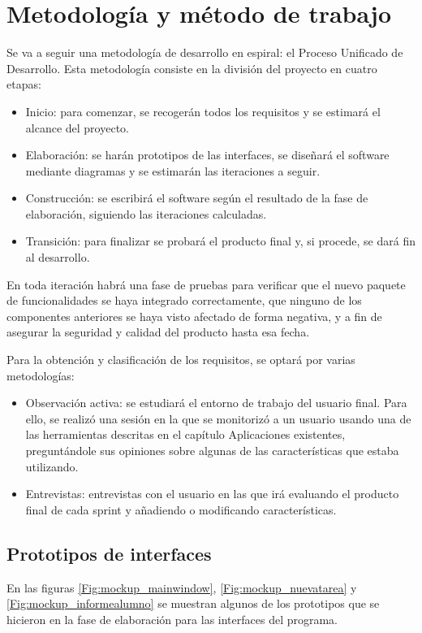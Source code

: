 \chapter{Metodología y método de trabajo}
\label{cap:MiMetodologia}


Se va a seguir una metodología de desarrollo en espiral: el Proceso Unificado de Desarrollo. Esta metodología consiste en la división del proyecto en cuatro etapas:
\begin{itemize}
    \item Inicio: para comenzar, se recogerán todos los requisitos y se estimará el alcance del proyecto.
    \item Elaboración: se harán prototipos de las interfaces, se diseñará el software mediante diagramas y se estimarán las iteraciones a seguir.
    \item Construcción: se escribirá el software según el resultado de la fase de elaboración, siguiendo las iteraciones calculadas. 
    \item Transición: para finalizar se probará el producto final y, si procede, se dará fin al desarrollo.
\end{itemize}
En toda iteración habrá una fase de pruebas para verificar que el nuevo paquete de funcionalidades se haya integrado correctamente, que ninguno de los componentes anteriores se haya visto afectado de forma negativa, y a fin de asegurar la seguridad y calidad del producto hasta esa fecha.

Para la obtención y clasificación de los requisitos, se optará por varias metodologías:
\begin{itemize}
	\item Observación activa: se estudiará el entorno de trabajo del usuario final. Para ello, se realizó una sesión en la que se monitorizó a un usuario usando una de las herramientas descritas en el capítulo Aplicaciones existentes, preguntándole sus opiniones sobre algunas de las características que estaba utilizando.
	\item Entrevistas: entrevistas con el usuario en las que irá evaluando el producto final de cada sprint y añadiendo o modificando características.
\end{itemize}

	
\section{Prototipos de interfaces}
En las figuras \ref{Fig:mockup_mainwindow}, \ref{Fig:mockup_nuevatarea} y \ref{Fig:mockup_informealumno} se muestran algunos de los prototipos que se hicieron en la fase de elaboración para las interfaces del programa.

